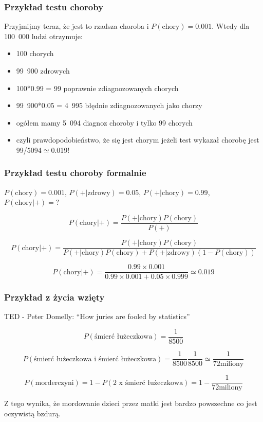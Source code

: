 \documentclass{beamer}
\begin{document}
\begin{frame}
\frametitle{
Przykład testu choroby}

Przyjmijmy teraz, że jest to rzadsza choroba i $P(\text{chory})=0.001$. Wtedy dla 100~000 ludzi otrzymuje:
\begin{itemize}
\item 100 chorych
\item 99~900 zdrowych
\item 100*0.99 = 99 poprawnie zdiagnozowanych chorych
\item 99~900*0.05 = 4~995 błędnie zdiagnozowanych jako chorzy
\item ogółem mamy 5~094 diagnoz choroby i tylko 99 chorych
\item czyli prawdopodobieństwo, że się jest chorym jeżeli test wykazał chorobę jest 99/5094$\simeq$0.019!
\end{itemize}

\end{frame}

\begin{frame}
\frametitle{
Przykład testu choroby formalnie}

$P(\text{chory})=0.001$, $P(+|\text{zdrowy})=0.05$, $P(+|\text{chory})=0.99$, $P(\text{chory}|+)=?$

$$
P(\text{chory}|+)=\frac{P(+|\text{chory})P(\text{chory})}{P(+)}
$$

$$
P(\text{chory}|+)=\frac{P(+|\text{chory})P(\text{chory})}{P(+|\text{chory})P(\text{chory})+P(+|\text{zdrowy})(1-P(\text{chory}))}
$$

$$
P(\text{chory}|+)=\frac{0.99\times0.001}{0.99\times0.001+0.05\times0.999}\simeq0.019
$$


\end{frame}

\begin{frame}



\frametitle{
Przykład z życia wzięty}

TED - Peter Domelly: ``How juries are fooled by statistics''

$$
P(\text{
śmierć łużeczkowa})=\frac{1}{8500}
$$

$$
P(\text{śmierć łużeczkowa i śmierć łużeczkowa} )=\frac{1}{8500}\frac{1}{8500}\simeq\frac{1}{72\text{miliony}}
$$

$$
P(\text{morderczyni})=1-P(\text{2 x śmierć łużeczkowa} )=1-\frac{1}{72\text{miliony}}
$$

Z tego wynika, że mordowanie dzieci przez matki jest bardzo powszechne co jest oczywistą bzdurą.

\end{frame}
\end{document}
